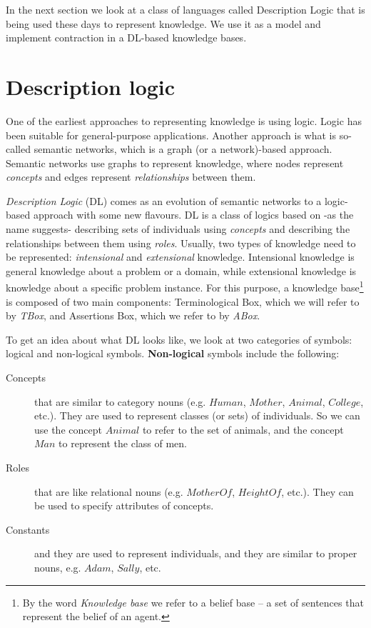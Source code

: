 In the next section we look at a class of languages called Description Logic that is being used these days to represent knowledge. We use it as a model and implement contraction in a DL-based knowledge bases.


\section{Description logic}
\label{dl}
One of the earliest approaches to representing knowledge is using logic. Logic has been suitable for general-purpose applications. Another approach is what is so-called semantic networks, which is a graph (or a network)-based approach. Semantic networks use graphs to represent knowledge\cite{dl}, where nodes represent \textit{concepts} and edges represent \textit{relationships} between them.

\textit{Description Logic} (DL) comes as an evolution of semantic networks to a logic-based approach with some new flavours. DL is a class of logics based on -as the name suggests- describing sets of individuals using \textit{concepts} and describing the relationships between them using \textit{roles}. Usually, two types of knowledge need to be represented: \textit{intensional} and \textit{extensional} knowledge. Intensional knowledge is general knowledge about a problem or a domain, while extensional knowledge is knowledge about a specific problem instance. For this purpose, a knowledge base\footnote{By the word \textit{Knowledge base} we refer to a belief base -- a set of sentences that represent the belief of an agent.} is composed of two main components: Terminological Box, which we will refer to by \textit{TBox}, and Assertions Box, which we refer to by \textit{ABox}.

To get an idea about what DL looks like, we look at two categories of symbols: logical and non-logical symbols. \textbf{Non-logical} symbols include the following:
\begin{description}
\item[Concepts] that are similar to category nouns (e.g. $Human$, $Mother$, $Animal$, $College$, etc.). They are used to represent classes (or sets) of individuals. So we can use the concept $Animal$ to refer to the set of animals, and the concept $Man$ to represent the class of men.
\item[Roles] that are like relational nouns (e.g. $MotherOf$, $HeightOf$, etc.). They can be used to specify attributes of concepts.
\item[Constants] and they are used to represent individuals, and they are similar to proper nouns, e.g. $Adam$, $Sally$, etc.
\end{description}

